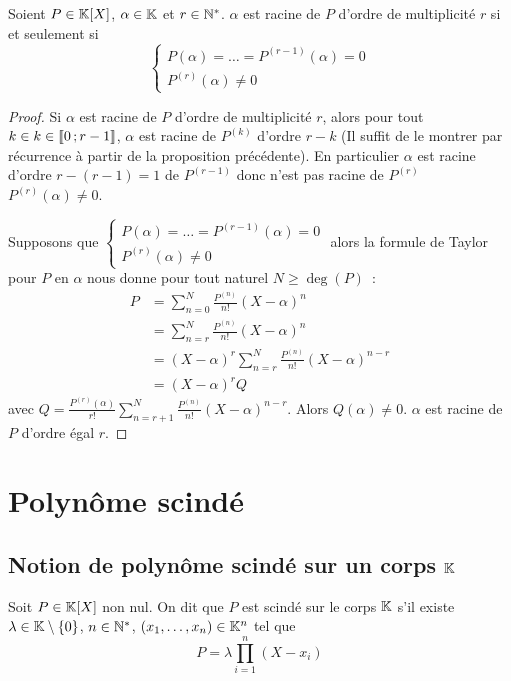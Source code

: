 \begin{prop}
  Soient $P \in \mathbb{K}[X]$, $\alpha \in \mathbb{K}$ et $r \in \mathbb{N}^*$. $\alpha$ est racine de $P$ d'ordre de multiplicité $r$ si et seulement si
  \begin{equation}
    \begin{cases}
      P(\alpha) = \ldots = P^{(r-1)}(\alpha)=0 \\
      P^{(r)}(\alpha) \neq 0
    \end{cases}
  \end{equation}
\end{prop}
\begin{proof}
  Si $\alpha$ est racine de $P$ d'ordre de multiplicité $r$, alors pour tout $k \in k \in \mathopen{\llbracket}0\mathclose{}\mathpunct{};r-1\mathclose{\rrbracket}$, $\alpha$ est racine de $P^{(k)}$ d'ordre $r-k$ (Il suffit de le montrer par récurrence à partir de la proposition précédente). En particulier $\alpha$ est racine d'ordre $r-(r-1)=1$ de $P^{(r-1)}$ donc n'est pas racine de $P^{(r)}$ $P^{(r)}(\alpha) \neq 0$.
  
  Supposons que $\begin{cases}
      P(\alpha) = \ldots = P^{(r-1)}(\alpha)=0 \\
      P^{(r)}(\alpha) \neq 0
    \end{cases}$
    alors la formule de Taylor pour $P$ en $\alpha$ nous donne pour tout naturel $N \geqslant \deg(P)$~:
    \begin{align}
      P &= \sum_{n=0}^N \frac{P^{(n)}}{n!} (X-\alpha)^n \\
      &= \sum_{n=r}^N \frac{P^{(n)}}{n!} (X-\alpha)^n \\
      &= (X-\alpha)^r \sum_{n=r}^N \frac{P^{(n)}}{n!} (X-\alpha)^{n-r}\\
      &= (X-\alpha)^r Q
    \end{align}
    avec $Q = \frac{P^{(r)}(\alpha)}{r!} \sum_{n=r+1}^N \frac{P^{(n)}}{n!} (X-\alpha)^{n-r}$. Alors $Q(\alpha) \neq 0$. $\alpha$ est racine de $P$ d'ordre égal $r$.
\end{proof}

\section{Polynôme scindé}

\subsection{Notion de polynôme scindé sur un corps $\mathbb{K}$}

\begin{defdef}
  Soit $P \in \mathbb{K}[X]$ non nul. On dit que $P$ est scindé sur le corps $\mathbb{K}$ s'il existe $\lambda \in \mathbb{K}\setminus\{0\}$, $n \in \mathbb{N}^*$, $(x_1, \ldots, x_n) \in \mathbb{K}^n$ tel que
  \begin{equation}
    P = \lambda \prod_{i=1}^n (X-x_i)
  \end{equation}
\end{defdef}

